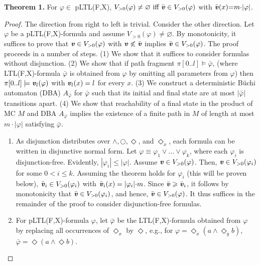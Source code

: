 \documentclass{llncs}
\renewcommand{\leq}{\leqslant}
\renewcommand{\geq}{\geqslant}
\renewcommand{\emptyset}{\varnothing}
\renewcommand{\a}[1]{\textbf{\textit{#1}}}
\newcommand{\de}{\Diamond}
\begin{document}
\section{}
\textbf{Theorem 1.} For $\varphi \in$ pLTL(F,X), $V_{{>} 0}(\varphi) \neq \emptyset \mbox{ iff } \bar{{\a v}} \in V_{{>} 0}(\varphi)$ with $\bar{{\a v}}(x){=}m{\cdot}|\varphi|$.
\begin{proof} 
The direction from right to left is trivial.
Consider the other direction.
Let $\varphi$ be a pLTL(F,X)-formula and assume $V_{> 0}(\varphi) \neq \emptyset$.
By monotonicity, it suffices to prove that ${\a v}\in V_{>0}(\varphi)$ with ${\a v} \not\leq \bar{{\a v}}$ implies $\bar{{\a v}} \in V_{>0}(\varphi)$.
The proof proceeds in a number of steps. 
(1) We show that it suffices to consider formulas without disjunction. 
(2) We show that if path fragment
$\pi[0..l] \models \bar\varphi$, (where LTL(F,X)-formula $\bar\varphi$ is obtained from $\varphi$ by omitting all parameters from $\varphi$) 
then $\pi[0..l] \models {\a v}_l(\varphi)$  with ${\a v}_l(x) = l$ for every $x$.
(3) We construct a deterministic B\"uchi automaton (DBA) $A_{\bar\varphi}$ for $\bar\varphi$ such that its initial and final state are at most $| \bar\varphi |$ transitions apart.
(4) We show that reachability of a final state in the product of MC $M$ and DBA $A_{\bar\varphi}$ implies the existence of a finite path in $M$  
of length at most $m{\cdot}|\varphi|$ satisfying $\bar\varphi$.
\begin{enumerate}
\item
As disjunction distributes over $\wedge, {\pmb\bigcirc}, \de$, and $\de_x$, each formula can be written in disjunctive normal form.
Let $\varphi \equiv \varphi_1 \vee \ldots \vee \varphi_k$, where each $\varphi_i$ is disjunction-free. 
Evidently, $|\varphi_i | \leq | \varphi |$.
Assume ${\a v} \in V_{> 0}(\varphi)$.
Then, ${\a v} \in V_{> 0}(\varphi_i)$ for some $0 < i \leq k$.
Assuming the theorem holds for $\varphi_i$ (this will be proven below), $\bar { {\a v}}_i \in V_{> 0}(\varphi_i)$ with 
$\bar { {\a v}}_i(x) =  |\varphi_i|{\cdot} m$.
Since $\bar{ {\a v}} \geq \bar{ {\a v}}_i$, it follows by monotonicity that $\bar{ {\a v}} \in V_{> 0}(\varphi_i)$, 
and hence, $\bar{ {\a v}} \in V_{> 0}(\varphi)$.
It thus suffices in the remainder of the proof to consider disjunction-free formulas.
\item
For pLTL(F,X)-formula $\varphi$, let $\bar \varphi$ be the LTL(F,X)-formula obtained from $\varphi$ by replacing all occurrences of $\de_x$  by $\de$, 
e.g., for $\varphi = \de_x(a \wedge \de_y b)$, $\bar\varphi = \de(a \wedge\de b)$. 

\end{enumerate}
\end{proof}
\end{document}
